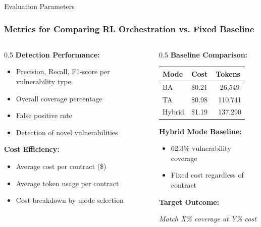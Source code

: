 \documentclass[aspectratio=169]{beamer}
\begin{document}
\begin{frame}{Evaluation Parameters}
\frametitle{Metrics for Comparing RL Orchestration vs. Fixed Baseline}

\begin{columns}[T]
\begin{column}{0.5\textwidth}
\textbf{Detection Performance:}
\begin{itemize}
    \item Precision, Recall, F1-score per vulnerability type
    \item Overall coverage percentage
    \item False positive rate
    \item Detection of novel vulnerabilities
\end{itemize}

\vspace{0.5cm}

\textbf{Cost Efficiency:}
\begin{itemize}
    \item Average cost per contract (\$)
    \item Average token usage per contract
    \item Cost breakdown by mode selection
\end{itemize}
\end{column}

\begin{column}{0.5\textwidth}
\textbf{Baseline Comparison:}

\begin{table}[h]
\centering
\small
\begin{tabular}{lcc}
\hline
\textbf{Mode} & \textbf{Cost} & \textbf{Tokens} \\
\hline
BA & \$0.21 & ~26,549 \\
TA & \$0.98 & ~110,741 \\
Hybrid & \$1.19 & ~137,290 \\
\hline
\end{tabular}
\end{table}

\vspace{0.3cm}

\textbf{Hybrid Mode Baseline:}
\begin{itemize}
    \item 62.3\% vulnerability coverage
    \item Fixed cost regardless of contract
\end{itemize}

\vspace{0.3cm}

\textbf{Target Outcome:}
\begin{center}
\textit{Match X\% coverage at Y\% cost}
\end{center}
\end{column}
\end{columns}

\end{frame}
\end{document}
